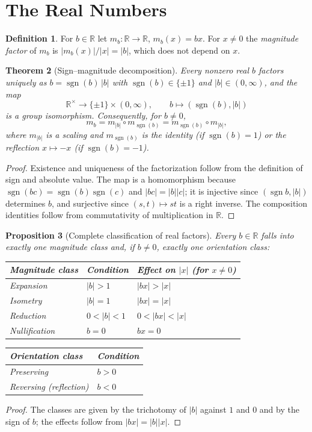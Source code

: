 \documentclass[12pt]{article}
\newtheorem{theorem}{Theorem}
\newtheorem{proposition}[theorem]{Proposition}
\theoremstyle{definition}
\newtheorem{definition}[theorem]{Definition}
\theoremstyle{remark}
\newcommand{\R}{\mathbb{R}}
\newcommand{\sgn}{\operatorname{sgn}}
\begin{document}
\section{The Real Numbers}\label{sec:real}

\begin{definition}
For $b\in\R$ let $m_b:\R\to\R$, $m_b(x)=bx$. For $x\neq0$ the \emph{magnitude factor} of $m_b$ is $|m_b(x)|/|x|=|b|$, which does not depend on $x$.
\end{definition}

\begin{theorem}[Sign--magnitude decomposition]\label{thm:real}
Every nonzero real $b$ factors uniquely as $b=\sgn(b)\,|b|$ with $\sgn(b)\in\{\pm1\}$ and $|b|\in(0,\infty)$, and the map
\[
\R^{\times}\to\{\pm1\}\times(0,\infty),\qquad b\mapsto(\sgn(b),|b|)
\]
is a group isomorphism. Consequently, for $b\neq0$,
\[
m_b=m_{|b|}\circ m_{\sgn(b)}=m_{\sgn(b)}\circ m_{|b|},
\]
where $m_{|b|}$ is a scaling and $m_{\sgn(b)}$ is the identity (if $\sgn(b)=1$) or the reflection $x\mapsto -x$ (if $\sgn(b)=-1$).
\end{theorem}
\begin{proof}
Existence and uniqueness of the factorization follow from the definition of sign and absolute value. The map is a homomorphism because $\sgn(bc)=\sgn(b)\sgn(c)$ and $|bc|=|b||c|$; it is injective since $(\sgn b,|b|)$ determines $b$, and surjective since $(s,t)\mapsto st$ is a right inverse. The composition identities follow from commutativity of multiplication in $\R$.
\end{proof}

\begin{proposition}[Complete classification of real factors]\label{prop:classification}
Every $b\in\R$ falls into exactly one magnitude class and, if $b\ne0$, exactly one orientation class:
\begin{center}
\begin{tabular}{@{}lll@{}}
\toprule
Magnitude class & Condition & Effect on $|x|$ (for $x\ne0$)\\\midrule
Expansion & $|b|>1$ & $|bx|>|x|$\\
Isometry & $|b|=1$ & $|bx|=|x|$\\
Reduction & $0<|b|<1$ & $0<|bx|<|x|$\\
Nullification & $b=0$ & $bx=0$\\\bottomrule
\end{tabular}
\qquad
\begin{tabular}{@{}ll@{}}
\toprule
Orientation class & Condition\\\midrule
Preserving & $b>0$\\
Reversing (reflection) & $b<0$\\\bottomrule
\end{tabular}
\end{center}
\end{proposition}
\begin{proof}
The classes are given by the trichotomy of $|b|$ against $1$ and $0$ and by the sign of $b$; the effects follow from $|bx|=|b||x|$.
\end{proof}
\end{document}
